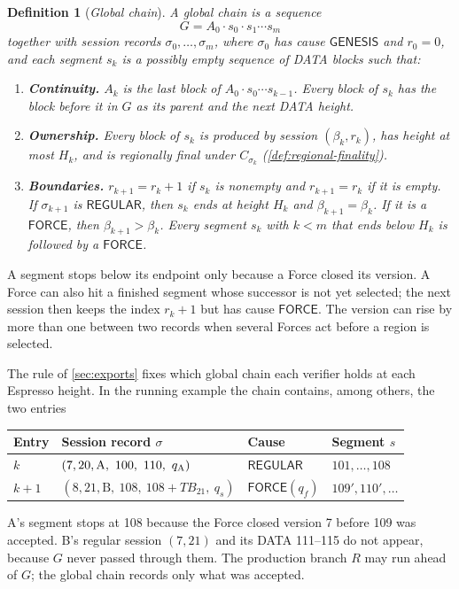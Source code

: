 \documentclass[11pt,a4paper]{article}
\newcommand{\TB}{\mathit{TB}}
\newcommand{\tagg}[1]{\ensuremath{\mathsf{#1}}}
\newcommand{\defterm}[1]{\textcolor{rrBlue}{\textit{#1}}}
\newtheorem{definition}{Definition}[section]
\begin{document}
\begin{definition}[\defterm{Global chain}]
\label{def:global-chain}
A global chain is a sequence
\[
 G=A_0\cdot s_0\cdot s_1\cdots s_m
\]
together with session records $\sigma_0,\ldots,\sigma_m$, where
$\sigma_0$ has cause \tagg{GENESIS} and $r_0=0$, and each segment $s_k$ is
a possibly empty sequence of DATA blocks such that:
\begin{enumerate}[label=(\roman*),itemsep=2pt]
\item \textbf{Continuity.} $A_k$ is the last block of
$A_0\cdot s_0\cdots s_{k-1}$. Every block of $s_k$ has the block before it
in $G$ as its parent and the next DATA height.
\item \textbf{Ownership.} Every block of $s_k$ is produced by session
$(\beta_k,r_k)$, has height at most $H_k$, and is regionally final under
$C_{\sigma_k}$ (\cref{def:regional-finality}).
\item \textbf{Boundaries.} $r_{k+1}=r_k+1$ if $s_k$ is nonempty and
$r_{k+1}=r_k$ if it is empty. If $\sigma_{k+1}$ is \tagg{REGULAR}, then
$s_k$ ends at height $H_k$ and $\beta_{k+1}=\beta_k$. If it is a
\tagg{FORCE}, then $\beta_{k+1}>\beta_k$. Every segment $s_k$ with $k<m$
that ends below $H_k$ is followed by a \tagg{FORCE}.
\end{enumerate}
\end{definition}
A segment stops below its endpoint only because a Force closed its
version. A Force can also hit a finished segment whose successor is not
yet selected; the next session then keeps the index $r_k+1$ but has
cause \tagg{FORCE}. The version can rise by more than one between two
records when several Forces act before a region is selected.

The rule of \cref{sec:exports} fixes which global chain each verifier
holds at each Espresso height. In the running example the chain
contains, among others, the two entries
\begin{center}\small
\begin{tabular}{@{}llll@{}}\toprule
Entry & Session record $\sigma$ & Cause & Segment $s$\\\midrule
$k$ & $(7,20,\text{A},\ 100,\ 110,\ q_{\rm A})$ & \tagg{REGULAR} & $101,\ldots,108$\\
$k+1$ & $(8,21,\text{B},\ 108,\ 108+\TB_{21},\ q_s)$ & \tagg{FORCE}$(q_f)$ & $109',110',\ldots$\\\bottomrule
\end{tabular}
\end{center}
A's segment stops at 108 because the Force closed version 7 before 109
was accepted. B's regular session $(7,21)$ and its DATA 111--115 do not
appear, because $G$ never passed through them. The production branch
$R$ may run ahead of $G$; the global chain records only what was
accepted.
\end{document}
